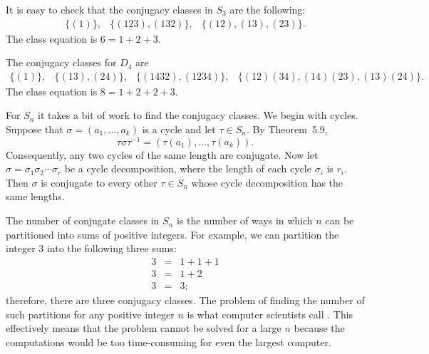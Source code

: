  
\medskip
 
 
\begin{example}
It is easy to check that  the conjugacy classes in $S_3$ are the
following: 
$$
\begin{array}{ccc}
\{ (1) \},  & \{ (123), (132) \}, & \{(12), (13), (23) \}.
\end{array}
$$
The class equation is $6 = 1+2+3$.
\end{example}
 
 
\medskip
 
 
\begin{example}
The conjugacy classes for $D_4$ are
$$
\begin{array}{cccc}
\{ (1) \}, &
\{ (13), (24) \}, &
\{ (1432), (1234) \}, &
\{ (12)(34), (14)(23), (13)(24) \}.
\end{array}
$$
The class equation is $8 = 1 + 2 + 2 + 3$.
\end{example}
 
 
\medskip
 
 
\begin{example}
For $S_n$ it takes a bit of work to find the conjugacy classes.  We
begin with cycles.  Suppose that $\sigma = ( a_1, \ldots, a_k)$ is a
cycle and let $\tau \in S_n$. By Theorem~5.9,
$$
\tau \sigma \tau^{-1} = ( \tau( a_1), \ldots, \tau(a_k)).
$$
Consequently, any two cycles of the same length are conjugate. Now let
$\sigma = \sigma_1 \sigma_2 \cdots \sigma_r$ be a cycle decomposition,
where the length of each cycle $\sigma_i$ is $r_i$. Then $\sigma$ is
conjugate to every other $\tau \in S_n$ whose cycle decomposition has
the same lengths. 
 
 
The number of conjugate classes in $S_n$ is the number of ways in
which $n$ can be partitioned into sums of positive integers. For
example, we can partition the integer 3 into the following three sums: 
\begin{eqnarray*}
3 & = & 1 + 1 + 1 \\
3 & = & 1 + 2 \\
3 & = & 3;
\end{eqnarray*}
therefore, there are three conjugacy classes. The problem of finding
the number of such partitions for any positive integer $n$ is what
computer scientists call .  This effectively means
that the problem cannot be solved for a large $n$ because the
computations would be too time-consuming for even the largest computer. 
\end{example}
 
 
\medskip
 
